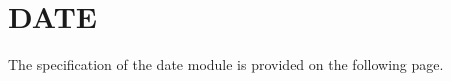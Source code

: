 \documentclass[runningheads,12pt]{article}
\begin{document}


\section{DATE}
The specification of the date module is provided on the following page.
\newpage

\centering 
    
%
\end{document}
